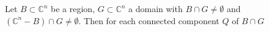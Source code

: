 Let $B \subset \mathbb{C}^n$ be a region, $G \subset \mathbb{C}^n$ a domain with $B \cap G \neq \emptyset$ and $(\mathbb{C}^n - B) \cap G \neq \emptyset$. Then for each connected component $Q$ of $B \cap G$
